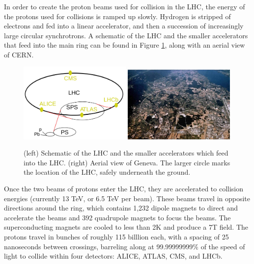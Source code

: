 In order to create the proton beams used for collision in the LHC, the energy of the protons used for collisions is ramped up slowly. Hydrogen is stripped of electrons and fed into a linear accelerator, and then a succession of increasingly large circular synchrotrons. A schematic of the LHC and the smaller accelerators that feed into the main ring can be found in Figure \ref{Fig:Detect:LHC}, along with an aerial view of CERN.
\begin{figure}[h!]
    \centering
        \includegraphics[width=0.49\textwidth]{F3/LHC}
        \includegraphics[width=0.49\textwidth]{F3/LHC2}
        \caption{(left) Schematic of the LHC and the smaller accelerators which feed into the LHC. (right) Aerial view of Geneva. The larger circle marks the location of the LHC, safely underneath the ground.}
        \label{Fig:Detect:LHC}
\end{figure}
Once the two beams of protons enter the LHC, they are accelerated to collision energies (currently 13 TeV, or 6.5 TeV per beam). These beams travel in opposite directions around the ring, which contains 1,232 dipole magnets to direct and accelerate the beams and 392 quadrupole magnets to focus the beams. The superconducting magnets are cooled to less than 2K and produce a 7T field. The protons travel in bunches of roughly 115 billlion each, with a spacing of 25 nanoseconds between crossings, barreling along at 99.99999999$\%$ of the speed of light to collide within four detectors: ALICE, ATLAS, CMS, and LHCb.

